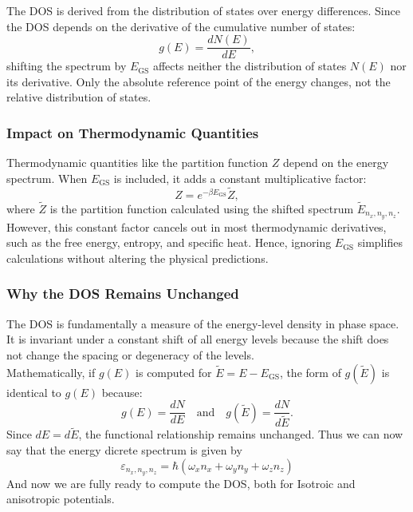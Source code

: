 \documentclass{article}
\numberwithin{equation}{section}
\numberwithin{equation}{subsection}
\begin{document}
The DOS is derived from the distribution of states over energy differences. Since the DOS depends on the derivative of the cumulative number of states:
\[
g(E) = \frac{dN(E)}{dE},
\]
shifting the spectrum by \( E_{\text{GS}} \) affects neither the distribution of states \( N(E) \) nor its derivative. Only the absolute reference point of the energy changes, not the relative distribution of states.

\subsubsection{Impact on Thermodynamic Quantities}
Thermodynamic quantities like the partition function \( Z \) depend on the energy spectrum. When \( E_{\text{GS}} \) is included, it adds a constant multiplicative factor:
\[
Z = e^{-\beta E_{\text{GS}}} \tilde{Z},
\]
where \( \tilde{Z} \) is the partition function calculated using the shifted spectrum \( \tilde{E}_{\mathit{n}_{\mathit{x}},\mathit{n}_{\mathit{y}},\mathit{n}_{\mathit{z}}} \). However, this constant factor cancels out in most thermodynamic derivatives, such as the free energy, entropy, and specific heat. Hence, ignoring \( E_{\text{GS}} \) simplifies calculations without altering the physical predictions.

\subsubsection{Why the DOS Remains Unchanged}
The DOS is fundamentally a measure of the energy-level density in phase space. It is invariant under a constant shift of all energy levels because the shift does not change the spacing or degeneracy of the levels.\\

Mathematically, if \( g(E) \) is computed for \( \tilde{E} = E - E_{\text{GS}} \), the form of \( g(\tilde{E}) \) is identical to \( g(E) \) because:
\[
g(E) = \frac{dN}{dE} \quad \text{and} \quad g(\tilde{E}) = \frac{dN}{d\tilde{E}}.
\]
Since \( dE = d\tilde{E} \), the functional relationship remains unchanged.
Thus we can now say that the energy dicrete spectrum is given by
\begin{equation}
    \varepsilon_{\mathit{n}_{\mathit{x}},\mathit{n}_{\mathit{y}},\mathit{n}_{\mathit{z}}}  = \hbar(\omega_{\mathit{x}} \mathit{n}_{\mathit{x}} + \omega_{\mathit{y}} \mathit{n}_{\mathit{y}} + \omega_{\mathit{z}} \mathit{n}_{\mathit{z}})
\end{equation}
And now we are fully ready to compute the DOS, both for Isotroic and anisotropic potentials.
\end{document}
